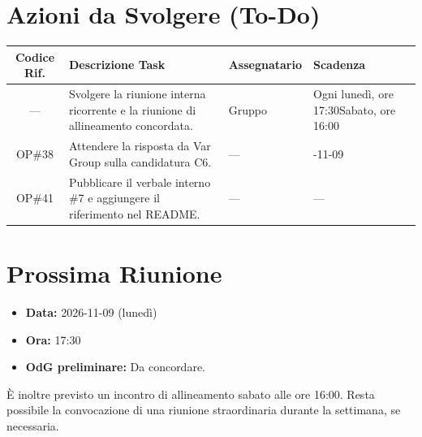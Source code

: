 \documentclass[a4paper, 11pt]{article}
\begin{document}
\vspace{0.5cm}
\section{Azioni da Svolgere (To-Do)}
\begin{tabularx}{\textwidth}{|c|X|>{\raggedright\arraybackslash}p{3cm}|>{\raggedright\arraybackslash}p{2.5cm}|}
\hline
\textbf{Codice Rif.} & \textbf{Descrizione Task} & \textbf{Assegnatario} & \textbf{Scadenza} \\ \hline
--- & Svolgere la riunione interna ricorrente e la riunione di allineamento concordata. & Gruppo & Ogni lunedì, ore 17:30\newline Sabato, ore 16:00 \\ \hline
OP\#38 & Attendere la risposta da Var Group sulla candidatura C6. & --- & 2026-11-09 \\ \hline
OP\#41 & Pubblicare il verbale interno \#7 e aggiungere il riferimento nel README. & --- & --- \\ \hline
\end{tabularx}

\vspace{0.5cm}
\section{Prossima Riunione}
\begin{itemize}
    \item \textbf{Data:} 2026-11-09 (lunedì)
    \item \textbf{Ora:} 17:30
    \item \textbf{OdG preliminare:} Da concordare.
\end{itemize}

È inoltre previsto un incontro di allineamento sabato alle ore 16:00. Resta possibile la convocazione di una riunione straordinaria durante la settimana, se necessaria.
\end{document}
